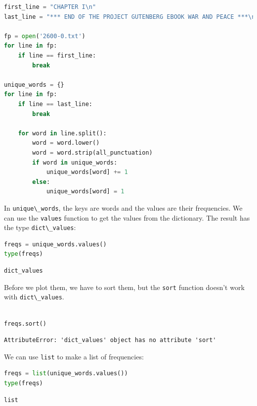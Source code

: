 \begin{lstlisting}[language=Python,style=source]
first_line = "CHAPTER I\n"
last_line = "*** END OF THE PROJECT GUTENBERG EBOOK WAR AND PEACE ***\n"

fp = open('2600-0.txt')
for line in fp:
    if line == first_line:
        break

unique_words = {}
for line in fp:
    if line == last_line:
        break
        
    for word in line.split():
        word = word.lower()
        word = word.strip(all_punctuation)
        if word in unique_words:
            unique_words[word] += 1
        else:
            unique_words[word] = 1
\end{lstlisting}

In \passthrough{\lstinline!unique\_words!}, the keys are words and the
values are their frequencies. We can use the
\passthrough{\lstinline!values!} function to get the values from the
dictionary. The result has the type
\passthrough{\lstinline!dict\_values!}:

\begin{lstlisting}[language=Python,style=source]
freqs = unique_words.values()
type(freqs)
\end{lstlisting}

\begin{lstlisting}[style=output]
dict_values
\end{lstlisting}

Before we plot them, we have to sort them, but the
\passthrough{\lstinline!sort!} function doesn't work with
\passthrough{\lstinline!dict\_values!}.

\begin{lstlisting}[language=Python,style=source]
%%expect AttributeError

freqs.sort()
\end{lstlisting}

\begin{lstlisting}[style=output]
AttributeError: 'dict_values' object has no attribute 'sort'
\end{lstlisting}

We can use \passthrough{\lstinline!list!} to make a list of frequencies:

\begin{lstlisting}[language=Python,style=source]
freqs = list(unique_words.values())
type(freqs)
\end{lstlisting}

\begin{lstlisting}[style=output]
list
\end{lstlisting}

